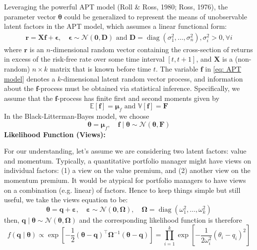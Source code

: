 \documentclass[11pt]{article}
\theoremstyle{plain} %
\newenvironment{topic}
  {\color{C2}\normalfont\begin{framed}\begingroup}
    {\endgroup\end{framed}}
\theoremstyle{remark}
\begin{document}
\begin{topic}
  Leveraging the powerful APT model (Roll \& Ross, 1980; Ross, 1976), the parameter vector $\boldsymbol{\theta}$ could be generalized to
  represent the means of unobservable latent factors in the APT
  model, which assumes a linear functional form:
  \begin{align}
    \boldsymbol{r}=\boldsymbol{X} \boldsymbol{f}+\boldsymbol{\epsilon},
    \quad \boldsymbol{\epsilon}\sim \mathcal{N}\left(\boldsymbol{0}, \boldsymbol{D}\right) \text{ and } \boldsymbol{D}=\operatorname{diag}\left(\sigma_1^2, \ldots, \sigma_n^2\right), \sigma_i^2>0,  \forall i
    \label{eq: APT model}
  \end{align}
  where $\boldsymbol{r}$ is an $n$-dimensional random vector containing the
  cross-section of returns in excess of the risk-free rate over some time interval
  $[t, t+1]$, and $\boldsymbol{X}$ is a (non-random) $n \times k$ matrix that is
  known before time $t$. The variable $\boldsymbol{f}$ in \cref{eq: APT model} denotes a
  $k$-dimensional latent random vector process, and
  information about the $\boldsymbol{f}$-process must be obtained via statistical
  inference. Specifically, we assume that the $\boldsymbol{f}$-process has finite
  first and second moments given by
  $$
    \mathbb{E}[\boldsymbol{f}]=\boldsymbol{\mu}_f \text { and } \mathbb{V}[\boldsymbol{f}]=\boldsymbol{F}
  $$
  In the Black-Litterman-Bayes model, we choose
  $$
    \boldsymbol{\theta} = \boldsymbol{\mu}_f,\quad
    \boldsymbol{f}\mid\boldsymbol{\theta} \sim \mathcal{N}\left(\boldsymbol{\theta}, \boldsymbol{F}\right)
  $$
  \textbf{Likelihood Function (Views):}

  For our understanding, let's assume we are considering two
  latent factors: value and momentum. Typically, a quantitative portfolio manager might have
  views on individual factors: (1) a view on the value premium, and (2) another
  view on the momentum premium. It would be atypical for portfolio managers to
  have views on a combination (e.g. linear) of factors. Hence to keep things simple but
  still useful, we take the views equation to be:
  $$
    \boldsymbol{\theta}=\boldsymbol{q}+\boldsymbol{\varepsilon}, \quad \boldsymbol{\varepsilon} \sim \mathcal{N}(\mathbf{0}, \boldsymbol{\Omega}), \quad \boldsymbol{\Omega}=\operatorname{diag}\left(\omega_1^2, \ldots, \omega_k^2\right)
  $$
  then, $\boldsymbol{q} \mid \boldsymbol{\theta} \sim \mathcal{N}(\boldsymbol{\theta},
    \boldsymbol{\Omega})$ and the corresponding likelihood function is therefore
  $$
    f(\boldsymbol{q} \mid \boldsymbol{\theta}) \propto \exp \left[-\frac{1}{2}(\boldsymbol{\theta}-\boldsymbol{q})^{\top} \boldsymbol{\Omega}^{-1}(\boldsymbol{\theta}-\boldsymbol{q})\right]=\prod_{i=1}^k \exp \left[-\frac{1}{2 \omega_i^2}\left(\theta_i-q_i\right)^2\right]
  $$


\end{topic}
\end{document}
